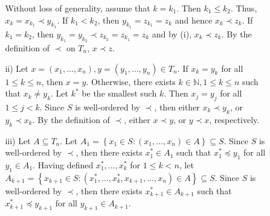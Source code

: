 \documentclass[letterpaper, reqno,11pt]{article}
\newcommand{\NN}{\mathbb{N}}
\begin{document}
\begin{enumerate}
\begin{enumerate}
\begin{enumerate}
            Without loss of generality, assume that $k = k_1$. Then $k_1 \leq k_2$. Thus, $x_k = x_{k_1} \prec y_{k_1}$. If $k_1 < k_2$, then $y_{k_1} = z_{k_1} = z_k$ and hence $x_k \prec z_k$. If $k_1 = k_2$, then $y_{k_1} = y_{k_2} \prec z_{k_2} = z_{k_1} = z_k$ and by (i), $x_k \prec z_k$. By the definition of $\prec$ on $T_n$, $x \prec z$.
            \item[ii)] Let $x = \left(x_1, \ldots, x_n\right), y = \left(y_1, \ldots, y_n\right) \in T_n$. If $x_k = y_k$ for all $1 \leq k \leq n$, then $x = y$. Otherwise, there exists $k \in \NN, 1 \leq k \leq n$ such that $x_k \neq y_k$. Let $k^*$ be the smallest such $k$. Then $x_j = y_j$ for all $1 \leq j < k$. Since $S$ is well-ordered by $\prec$, then either $x_k \prec y_k$, or $y_k \prec x_k$. By the definition of $\prec$, either $x \prec y$, or $y \prec x$, respectively.
            \item[iii)] Let $A \subseteq T_n$. Let $A_1 = \left\{ x_1 \in S : \left(x_1, \ldots, x_n\right) \in A \right\} \subseteq S$. Since $S$ is well-ordered by $\prec$, then there exists $x_1^* \in A_1$ such that $x_1^* \preceq y_1$ for all $y_1 \in A_1$. Having defined $x_1^*, \ldots, x_k^*$ for $1 \leq k < n$, let $A_{k + 1} = \left\{ x_{k + 1} \in S : \left(x_1^*, \ldots, x_k^*, x_{k + 1}, \ldots, x_n\right) \in A \right\} \subseteq S$. Since $S$ is well-ordered by $\prec$, then there exists $x_{k + 1}^* \in A_{k + 1}$ such that $x_{k + 1}^* \preceq y_{k + 1}$ for all $y_{k + 1} \in A_{k + 1}$.


\end{enumerate}
\end{enumerate}
\end{enumerate}
\end{document}
